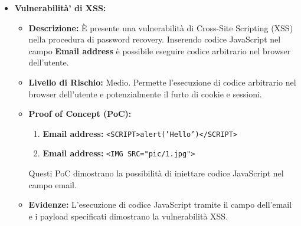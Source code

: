 \documentclass[12pt]{article}
\begin{document}
\begin{itemize}
\begin{itemize}
    \end{itemize}
    \item \textbf{Vulnerabilit\`{a}' di XSS:}
    \begin{itemize}
        \item \textbf{Descrizione:} \`{E} presente una vulnerabilit\`{a} di Cross-Site 
        Scripting (XSS) nella procedura di password recovery. Inserendo codice 
        JavaScript nel campo \textbf{Email address} \`{e} possibile eseguire codice 
        arbitrario nel browser dell'utente.
        \item \textbf{Livello di Rischio:} Medio. Permette l'esecuzione di codice 
        arbitrario nel browser dell'utente e potenzialmente il furto di cookie e 
        sessioni.
        \item \textbf{Proof of Concept (PoC):}
        \begin{enumerate}
            \item \textbf{Email address:} \texttt{<SCRIPT>alert('Hello')</SCRIPT>}
            \item \textbf{Email address:} \texttt{<IMG SRC="pic/1.jpg">}
        \end{enumerate}
        Questi PoC dimostrano la possibilit\`{a} di iniettare codice JavaScript nel 
        campo email.
        \item \textbf{Evidenze:} L'esecuzione di codice JavaScript tramite il 
        campo dell'email e i payload specificati dimostrano la vulnerabilit\`{a} XSS.
    \end{itemize}
\end{itemize}
\end{document}
